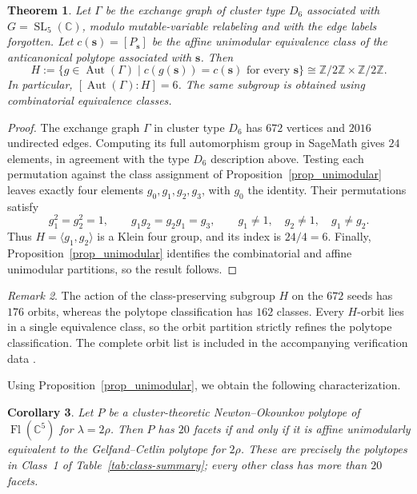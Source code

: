 \documentclass[10pt]{amsart}
\numberwithin{equation}{section}
\DeclareMathOperator{\SL}{SL}
\DeclareMathOperator{\flag}{Fl}
\theoremstyle{plain}
\newtheorem{theorem}{Theorem}[section]
\newtheorem{corollary}[theorem]{Corollary}
\theoremstyle{definition}
\theoremstyle{remark}
\newtheorem{remark}[theorem]{Remark}
\begin{document}
\begin{theorem}\label{thm_involutions}
Let $\Gamma$ be the exchange graph of cluster type $D_6$
associated with $G=\SL_5(\mathbb C)$, modulo mutable-variable
relabeling and with the edge labels forgotten.
Let $c(\bm s)=[P_{\bm s}]$ be the affine unimodular equivalence
class of the anticanonical polytope associated with $\bm s$.
Then
\[
H:=\{g\in\operatorname{Aut}(\Gamma)\mid
c(g(\bm s))=c(\bm s)\text{ for every }\bm s\}
\cong\mathbb Z/2\mathbb Z\times\mathbb Z/2\mathbb Z.
\]
In particular, $[\operatorname{Aut}(\Gamma):H]=6$.
The same subgroup is obtained using combinatorial
equivalence classes.
\end{theorem}
\begin{proof} 
The exchange graph $\Gamma$ in cluster type $D_6$ has $672$ vertices and $2016$
undirected edges. Computing its full automorphism group in
SageMath gives $24$ elements, in agreement with the
type $D_6$ description above.
Testing each permutation against the class assignment of
Proposition~\ref{prop_unimodular} leaves exactly four elements
$g_0,g_1,g_2,g_3$, with $g_0$ the identity.
Their permutations satisfy
\[
g_1^2=g_2^2=1,\qquad g_1g_2=g_2g_1=g_3,
\qquad g_1\ne1,\quad g_2\ne1,\quad g_1\ne g_2.
\]
Thus $H=\langle g_1,g_2\rangle$ is a Klein four group,
and its index is $24/4=6$.
Finally, Proposition~\ref{prop_unimodular} identifies the
combinatorial and affine unimodular partitions, so the result follows.	
\end{proof}
\begin{remark}
	The action of the class-preserving subgroup $H$ on the
	$672$ seeds has $176$ orbits, whereas the polytope
	classification has $162$ classes.
	Every $H$-orbit lies in a single equivalence class, so
	the orbit partition strictly refines the polytope
	classification.
	The complete orbit list is included in the accompanying
	verification data \cite{github}.
\end{remark}

Using Proposition~\ref{prop_unimodular}, we obtain the following characterization. 
\begin{corollary}\label{cor_GC_type}
Let $P$ be a cluster-theoretic Newton--Okounkov polytope of
$\flag(\mathbb C^5)$ for $\lambda=2\rho$.
Then $P$ has $20$ facets if and only if it is affine unimodularly
equivalent to the Gelfand--Cetlin polytope for $2\rho$.
These are precisely the polytopes in Class~1 of
Table~\ref{tab:class-summary}; every other class has more than
$20$ facets.
\end{corollary}
\end{document}
